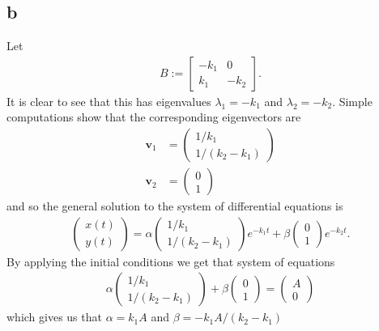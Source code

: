 \documentclass{unswmaths}
\begin{document}
\subsection*{b}
Let
\begin{align*}
   B := \left[
        \begin{array}{cc}
            -k_1 & 0 \\
            k_1 & - k_2
        \end{array}
        \right].
\end{align*}
It is clear to see that this has eigenvalues $ \lambda_1 = -k_1 $ and $ \lambda_2 = -k_2 $. Simple computations show that the corresponding eigenvectors are
\begin{align*}
    \mathbf{v}_1 &= \left( \begin{array}{c} 1/k_1 \\ 1/(k_2-k_1) \end{array}\right) \\
    \mathbf{v}_2 &= \left( \begin{array}{c} 0 \\ 1 \end{array}\right)  
\end{align*}
and so the general solution to the system of differential equations is
\begin{align*}
    \left( \begin{array}{c} x(t) \\ y(t) \end{array} \right) = \alpha \left( \begin{array}{c} 1/k_1 \\ 1/(k_2 - k_1) \end{array}\right) e^{-k_1 t} +  \beta \left( \begin{array}{c} 0 \\ 1 \end{array}\right) e^{-k_2 t}.
\end{align*}
By applying the initial conditions we get that system of equations
\begin{align}
    \alpha \left( \begin{array}{c} 1 / k_1 \\ 1 / (k_2 - k_1) \end{array} \right) + \beta \left( \begin{array}{c} 0 \\ 1 \end{array} \right) = \left( \begin{array}{c} A \\ 0 \end{array}\right)
\end{align}
which gives us that $ \alpha = k_1 A $ and $ \beta = -k_1 A / (k_2 - k_1 ) $
\end{document}
